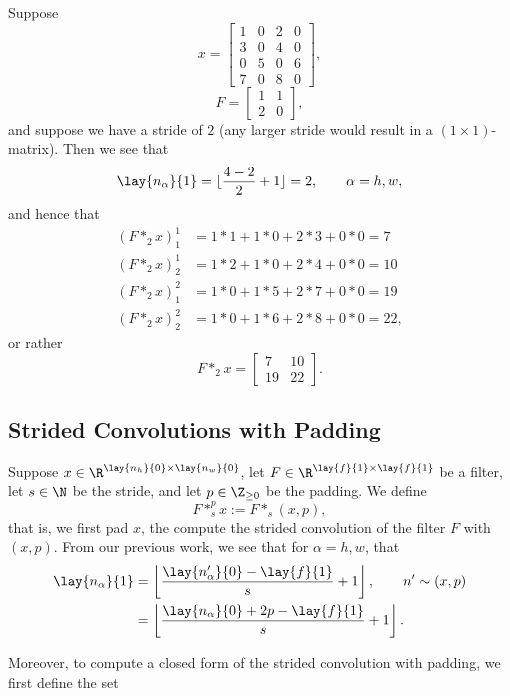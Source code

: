 \begin{ex}
	Suppose
	$$x=\begin{bmatrix}
		1&0&2&0\\
		3&0&4&0\\
		0&5&0&6\\
		7&0&8&0
	\end{bmatrix},$$
	$$F=\begin{bmatrix}
		1&1\\
		2&0
	\end{bmatrix},$$
	and suppose we have a stride of $2$ (any larger stride would result in a $(1\times 1)$-matrix).  Then we see that
	$$\lay{n_\alpha}{1}=\lfloor\frac{4-2}{2}+1\rfloor=2,\qquad \alpha=h,w,$$
	and hence that
	\begin{align*}
		(F*_2x)^1_1&=1*1+1*0+2*3+0*0=7\\
		(F*_2x)^1_2&=1*2+1*0+2*4+0*0=10\\
		(F*_2x)^2_1&=1*0+1*5+2*7+0*0=19\\
		(F*_2x)^2_2&=1*0+1*6+2*8+0*0=22,
	\end{align*}
	or rather
	$$F*_2x=\begin{bmatrix}
		7&10\\
		19&22
	\end{bmatrix}.$$
\end{ex}



\subsection{Strided Convolutions with Padding}

Suppose $x\in\R^{\lay{n_h}{0}\times \lay{n_w}{0}}$, let $F\in\R^{\lay{f}{1}\times\lay{f}{1}}$ be a filter, let $s\in\N$ be the stride, and let $p\in\Z_{\geq0}$ be the padding.  We define
$$F*_s^px:=F*_s(x,p),$$
that is, we first pad $x$, the compute the strided convolution of the filter $F$ with $(x,p)$.  From our previous work, we see that for $\alpha=h,w$, that
\begin{align*}
	\lay{n_\alpha}{1}&=\left\lfloor\frac{\lay{n'_\alpha}{0}-\lay{f}{1}}{s}+1\right\rfloor,\qquad n'\sim (x,p)\\
	&=\left\lfloor\frac{\lay{n_\alpha}{0}+2p-\lay{f}{1}}{s}+1\right\rfloor.
\end{align*}

Moreover, to compute a closed form of the strided convolution with padding, we first define the set

